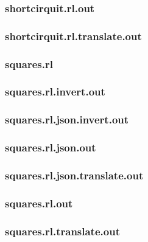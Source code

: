 \subsubsection{shortcirquit.rl.out}
\label{app:shortcirquit_rl.out}

\subsubsection{shortcirquit.rl.translate.out}
\label{app:shortcirquit_rl.translate.out}

\subsubsection{squares.rl}
\label{app:squares_rl}

\subsubsection{squares.rl.invert.out}
\label{app:squares_rl.invert.out}

\subsubsection{squares.rl.json.invert.out}
\label{app:squares_rl.json.invert.out}

\subsubsection{squares.rl.json.out}
\label{app:squares_rl.json.out}

\subsubsection{squares.rl.json.translate.out}
\label{app:squares_rl.json.translate.out}

\subsubsection{squares.rl.out}
\label{app:squares_rl.out}

\subsubsection{squares.rl.translate.out}
\label{app:squares_rl.translate.out}

